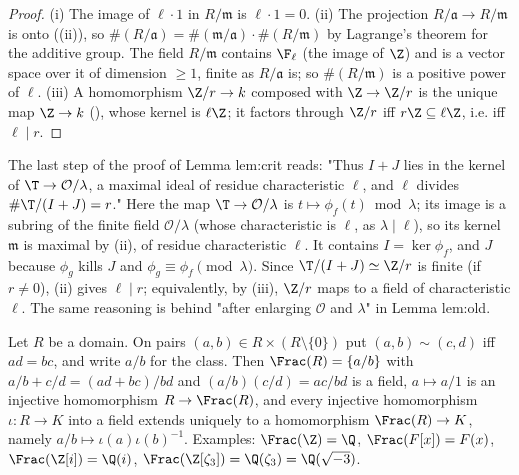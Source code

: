 \begin{proof}
(i) The image of $\ell\cdot1$ in $R/\mathfrak m$ is $\ell\cdot1=0$.
(ii) The projection $R/\mathfrak a\to R/\mathfrak m$ is onto ((ii)), so $\#(R/\mathfrak a)=\#(\mathfrak m/\mathfrak a)\cdot\#(R/\mathfrak m)$ by
Lagrange's theorem for the additive group. The field $R/\mathfrak m$ contains $\F_\ell$ (the image of $\Z$) and is a vector space over
it of dimension $\ge1$, finite as $R/\mathfrak a$ is; so $\#(R/\mathfrak m)$ is a positive power of $\ell$.
(iii) A homomorphism $\Z/r\to k$ composed with $\Z\to\Z/r$ is the unique map $\Z\to k$ (), whose kernel is
$\ell\Z$; it factors through $\Z/r$ iff $r\Z\subseteq\ell\Z$, i.e. iff $\ell\mid r$.
\end{proof}

\begin{paperlink}\label{pl:rings:crit-last}
The last step of the proof of Lemma lem:crit reads: "Thus $I+J$ lies in the
kernel of $\T\to\mathcal{O}/\lambda$, a maximal ideal of residue characteristic $\ell$, and $\ell$ divides $\#\T/(I+J)=r$." Here the
map $\T\to\mathcal O/\lambda$ is $t\mapsto\phi_f(t)\bmod\lambda$; its image is a subring of the finite field $\mathcal O/\lambda$ (whose
characteristic is $\ell$, as $\lambda\mid\ell$), so its kernel $\mathfrak m$ is maximal by (ii), of residue
characteristic $\ell$. It contains $I=\ker\phi_f$, and $J$ because $\phi_g$ kills $J$ and $\phi_g\equiv\phi_f\pmod\lambda$. Since
$\T/(I+J)\simeq\Z/r$ is finite (if $r\ne0$), (ii) gives $\ell\mid r$; equivalently, by (iii), $\Z/r$ maps to a field of
characteristic $\ell$. The same reasoning is behind "after enlarging $\mathcal{O}$ and $\lambda$" in Lemma lem:old.
\end{paperlink}

\begin{theorem}\label{thm:rings:fractions}
Let $R$ be a domain. On pairs $(a,b)\in R\times(R\setminus\{0\})$ put $(a,b)\sim(c,d)$ iff $ad=bc$, and write $a/b$ for the class. Then
$\Frac(R)=\{a/b\}$ with $a/b+c/d=(ad+bc)/bd$ and $(a/b)(c/d)=ac/bd$ is a field, $a\mapsto a/1$ is an injective homomorphism $R\to\Frac(R)$,
and every injective homomorphism $\iota\colon R\to K$ into a field extends uniquely to a homomorphism $\Frac(R)\to K$, namely
$a/b\mapsto\iota(a)\iota(b)^{-1}$. Examples: $\Frac(\Z)=\Q$, $\Frac(F[x])=F(x)$, $\Frac(\Z[i])=\Q(i)$, $\Frac(\Z[\zeta_3])=\Q(\zeta_3)=\Q(\sqrt{-3})$.
\end{theorem}

